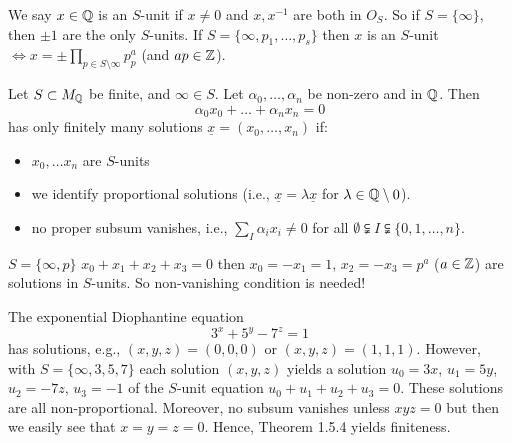 \documentclass[NumTh.tex]{subfiles}
\begin{document}
We say $x \in \mathbb{Q}$ is an $S$-unit if $x \neq 0$ and $x, x^{-1}$ are both in $O_S$.
So if $S = \{ \infty \}$, then $\pm 1$ are the only $S$-units. If $S = \{ \infty,p_1,\dots,p_s \}$ then $x$ is an $S$-unit $\iff x = \pm \prod_{p \in S \setminus \infty} p^a_p$ (and $ap \in \mathbb{Z}$).

\begin{theorem}
  Let $S \subset M_{\mathbb{Q}}$ be finite, and $\infty \in S$. Let $\alpha_0,\dots,\alpha_n$ be non-zero and in $\mathbb{Q}$.
  Then 
  \[ \alpha_0 x_0 + \dots + \alpha_n x_n = 0 \]
  has only finitely many solutions $\underline{x} = (x_0,\dots,x_n)$ if:
  \begin{itemize}
    \item $x_0,\dots x_n$ are $S$-units
    \item we identify proportional solutions (i.e., $\underline{x} = \lambda \underline{x}$ for $ \lambda \in \mathbb{Q} \setminus 0$).
    \item no proper subsum vanishes, i.e., $\sum_{I} \alpha_i x_i \neq 0$ for all $\emptyset \subsetneqq I \subsetneqq \{0,1,\dots,n\}$.
  \end{itemize}
\end{theorem}

\begin{rem}
  $S = \{\infty, p \}$ $x_0+x_1+x_2+x_3 = 0$ then $x_0 = - x_1 =  1$, $x_2 = - x_3 = p^a$ ($a \in \mathbb{Z}$)
  are solutions in $S$-units. So non-vanishing condition is needed!
\end{rem}

\begin{ex}
  The exponential Diophantine equation 
  \[ 3^x + 5^y - 7^z = 1 \]
  has solutions, e.g., $(x,y,z) = (0,0,0)$ or $(x,y,z) = (1,1,1)$.
  However, with $S = \{ \infty,3,5,7 \}$ each solution $(x,y,z)$ yields a solution $u_0 = 3x$, $u_1 = 5y$, $u_2 = - 7z$, $u_3 = - 1$ of the $S$-unit equation $u_0 + u_1 + u_2 + u_3 = 0$.
  These solutions are all non-proportional.
  Moreover, no subsum vanishes unless $x y z = 0$ but then we easily see that $x=y=z=0$.
  Hence, Theorem 1.5.4 yields finiteness.
\end{ex}
\end{document}
